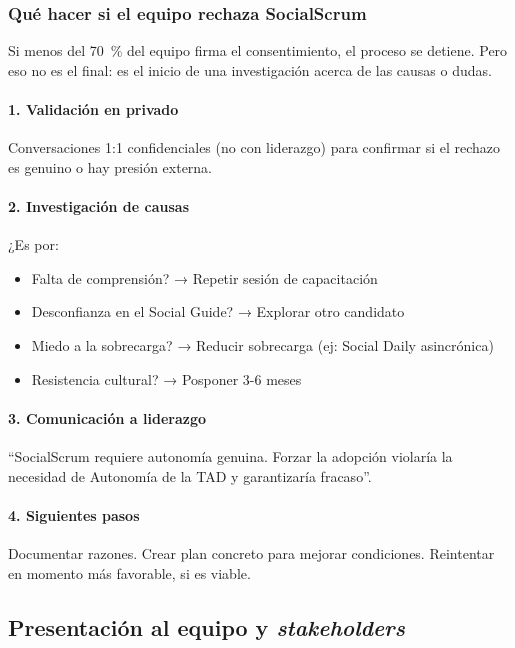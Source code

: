 \subsubsection{Qué hacer si el equipo rechaza SocialScrum}
\label{sec:rechazo-socialscrum}

Si menos del 70~\% del equipo firma el consentimiento, el proceso se detiene. Pero eso no es el final: es el inicio de una investigación acerca de las causas o dudas.

\paragraph{1. Validación en privado}
Conversaciones 1:1 confidenciales (no con liderazgo) para confirmar si el rechazo es genuino o hay presión externa.

\paragraph{2. Investigación de causas}
¿Es por:
\begin{itemize}
    \item Falta de comprensión? → Repetir sesión de capacitación
    \item Desconfianza en el Social Guide? → Explorar otro candidato
    \item Miedo a la sobrecarga? → Reducir sobrecarga (ej: Social Daily asincrónica)
    \item Resistencia cultural? → Posponer 3-6 meses
\end{itemize}

\paragraph{3. Comunicación a liderazgo}
``SocialScrum requiere autonomía genuina. Forzar la adopción violaría la necesidad de Autonomía de la TAD \cite{ryan2000self} y garantizaría fracaso''.

\paragraph{4. Siguientes pasos}
Documentar razones. Crear plan concreto para mejorar condiciones. Reintentar en momento más favorable, si es viable.

\subsection{Presentación al equipo y \textit{stakeholders}}

